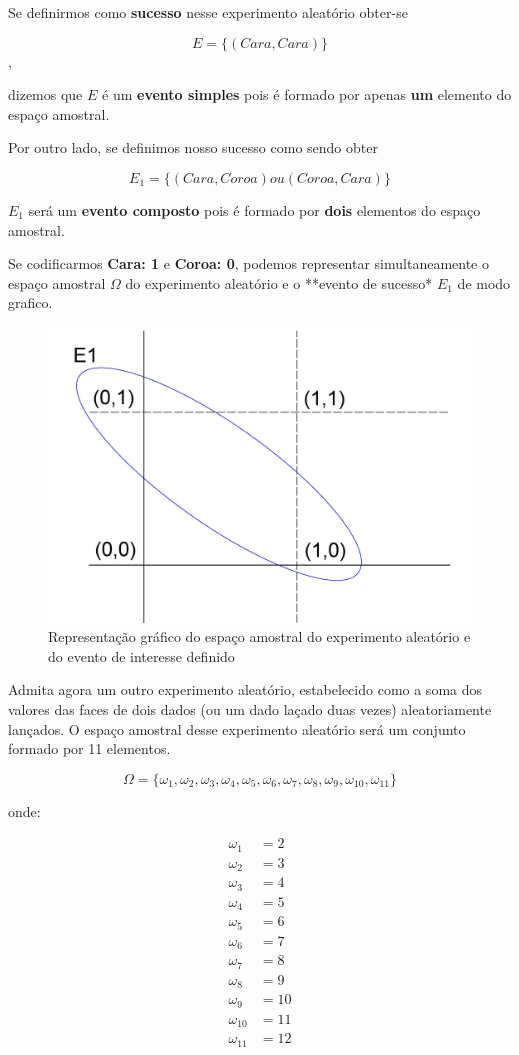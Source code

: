 \documentclass[
]{book}
\begin{document}
Se definirmos como \textbf{sucesso} nesse experimento aleatório obter-se

\[
E=\{(Cara, Cara)\}
\],

dizemos que \(E\) é um \textbf{evento simples} pois é formado por apenas \textbf{um} elemento do espaço amostral.

Por outro lado, se definimos nosso sucesso como sendo obter

\[
E_{1}=\{(Cara, Coroa) ou (Coroa, Cara)\}
\]

\(E_{1}\) será um \textbf{evento composto} pois é formado por \textbf{dois} elementos do espaço amostral.

Se codificarmos \textbf{Cara: 1} e \textbf{Coroa: 0}, podemos representar simultaneamente o espaço amostral \(\Omega\) do experimento aleatório e o **evento de sucesso* \(E_{1}\) de modo grafico.

\hfill\break

\begin{figure}

{\centering \includegraphics[width=0.5\linewidth]{images4/evento_grafico} 

}

\caption{Representação gráfico do espaço amostral do experimento aleatório e do evento de interesse definido}\label{fig:unnamed-chunk-50}
\end{figure}

Admita agora um outro experimento aleatório, estabelecido como a soma dos valores das faces de dois dados (ou um dado laçado duas vezes) aleatoriamente lançados. O espaço amostral desse experimento aleatório será um conjunto formado por 11 elementos.

\[
\Omega = \{\omega_{1}, \omega_{2}, \omega_{3}, \omega_{4}, \omega_{5}, \omega_{6}, \omega_{7}, \omega_{8}, \omega_{9}, \omega_{10}, \omega_{11}\}
\]

onde:

\begin{align*}
\omega_{1} & =  2\\
\omega_{2} & =  3\\
\omega_{3} & = 4\\
\omega_{4} & = 5\\
\omega_{5} & = 6\\
\omega_{6} & = 7 \\
\omega_{7} & = 8\\
\omega_{8} & = 9\\
\omega_{9} & = 10\\
\omega_{10} & = 11\\
\omega_{11} & = 12     
\end{align*}
\end{document}
